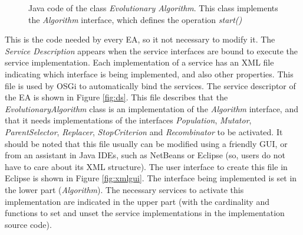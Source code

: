 \begin{figure}
\usebox{\mintedbox}
\caption{Java code of the class {\em Evolutionary Algorithm}. This class implements the {\em Algorithm} interface, which defines the operation {\em start()} } 
\label{fig:javaevo} 
\end{figure}


This is the code needed by every EA, so it not necessary to modify it. The {\em Service Description} appears when the service interfaces are bound to execute the service implementation. Each implementation of a service has an XML file indicating which interface is being implemented, and also other properties. This file is used by OSGi to automatically bind the services. The service descriptor of the EA is shown in Figure \ref{fig:ds}. This file describes that the {\em EvolutionaryAlgorithm} class is an implementation of the {\em Algorithm} interface, and that it needs implementations of the interfaces {\em Population}, {\em Mutator}, {\em ParentSelector}, {\em Replacer}, {\em StopCriterion} and {\em Recombinator} to be activated. It should be noted that this file usually can be modified using a friendly GUI, or from an assistant in Java IDEs, such as NetBeans or Eclipse (so, users do not have to care about its XML structure). The user interface to create this file in Eclipse is shown in Figure \ref{fig:xmlgui}. The interface being implemented is set in the lower part ({\em Algorithm}). The necessary services to activate this implementation are indicated in the upper part (with the cardinality and functions to set and unset the service implementations in the implementation source code).

